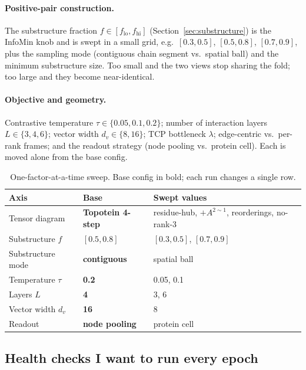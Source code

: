 \documentclass[11pt,a4paper]{article}
\theoremstyle{definition}
\begin{document}
\paragraph{Positive-pair construction.} The substructure fraction
$f\in[f_{\mathrm{lo}},f_{\mathrm{hi}}]$ (Section~\ref{sec:substructure}) is the
InfoMin knob and is swept in a small grid, e.g.\ $[0.3,0.5]$, $[0.5,0.8]$,
$[0.7,0.9]$, plus the sampling mode (contiguous chain segment vs.\ spatial ball) and
the minimum substructure size. Too small and the two views stop sharing the fold;
too large and they become near-identical.

\paragraph{Objective and geometry.} Contrastive temperature $\tau\in\{0.05,0.1,0.2\}$;
number of interaction layers $L\in\{3,4,6\}$; vector width $d_v\in\{8,16\}$; TCP
bottleneck $\lambda$; edge-centric vs.\ per-rank frames; and the readout strategy
(node pooling vs.\ protein cell). Each is moved alone from the base config.

\begin{table}[h]\centering\small
\caption{One-factor-at-a-time sweep. Base config in bold; each run changes a single row.}
\begin{tabular}{@{}lll@{}}
\toprule
Axis & Base & Swept values\\
\midrule
Tensor diagram        & \textbf{Topotein 4-step} & residue-hub, $+A^{2\sim1}$, reorderings, no-rank-3\\
Substructure $f$      & \textbf{$[0.5,0.8]$}     & $[0.3,0.5]$, $[0.7,0.9]$\\
Substructure mode     & \textbf{contiguous}      & spatial ball\\
Temperature $\tau$    & \textbf{0.2}             & 0.05, 0.1\\
Layers $L$            & \textbf{4}               & 3, 6\\
Vector width $d_v$    & \textbf{16}              & 8\\
Readout               & \textbf{node pooling}    & protein cell\\
\bottomrule
\end{tabular}
\end{table}

\subsection{Health checks I want to run every epoch}
\label{sec:health}
\end{document}
